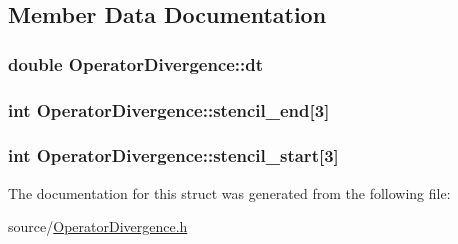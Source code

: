 \subsection{Member Data Documentation}
\hypertarget{struct_operator_divergence_ada6d0bb3bcf2d97b8051e12fc09faa72}{}
\subsubsection[{dt}]{\setlength{\rightskip}{0pt plus 5cm}double Operator\+Divergence\+::dt}\label{struct_operator_divergence_ada6d0bb3bcf2d97b8051e12fc09faa72}
\hypertarget{struct_operator_divergence_a1d109938ee351b7adc0bf85b3cf2656e}{}
\subsubsection[{stencil\+\_\+end}]{\setlength{\rightskip}{0pt plus 5cm}int Operator\+Divergence\+::stencil\+\_\+end\mbox{[}3\mbox{]}}\label{struct_operator_divergence_a1d109938ee351b7adc0bf85b3cf2656e}
\hypertarget{struct_operator_divergence_a748e5b6432ead32ed1570ab7b2ed1346}{}
\subsubsection[{stencil\+\_\+start}]{\setlength{\rightskip}{0pt plus 5cm}int Operator\+Divergence\+::stencil\+\_\+start\mbox{[}3\mbox{]}}\label{struct_operator_divergence_a748e5b6432ead32ed1570ab7b2ed1346}


The documentation for this struct was generated from the following file\+:\begin{DoxyCompactItemize}
\item 
source/\hyperlink{_operator_divergence_8h}{Operator\+Divergence.\+h}\end{DoxyCompactItemize}
